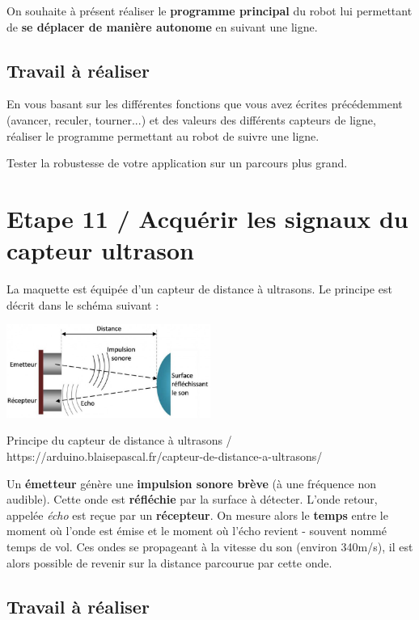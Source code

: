 \documentclass[a4paper,11pt,titlepage]{article} %
\begin{document}
On souhaite à présent réaliser le \textbf{programme principal} du robot lui permettant de \textbf{se déplacer de manière autonome} en suivant une ligne.


\subsection{Travail à réaliser}

\Manip En vous basant sur les différentes fonctions que vous avez écrites précédemment (avancer, reculer, tourner...) et des valeurs des différents capteurs de ligne, réaliser le programme permettant au robot de suivre une ligne.

\Manip Tester la robustesse de votre application sur un parcours plus grand.

\section{Etape 11 / Acquérir les signaux du capteur ultrason}

La maquette est équipée d'un capteur de distance à ultrasons. Le principe est décrit dans le schéma suivant :

\begin{center}
	\includegraphics[width=0.5\textwidth]{images/Principe_Ultrasons_1_arduino.blaisepascal.fr.jpg}
	
	Principe du capteur de distance à ultrasons / https://arduino.blaisepascal.fr/capteur-de-distance-a-ultrasons/
\end{center}

Un \textbf{émetteur} génère une \textbf{impulsion sonore brève} (à une fréquence non audible). Cette onde est \textbf{réfléchie} par la surface à détecter. L'onde retour, appelée \textsl{écho} est reçue par un \textbf{récepteur}. On mesure alors le \textbf{temps} entre le moment où l'onde est émise et le moment où l'écho revient - souvent nommé temps de vol. Ces ondes se propageant à la vitesse du son (environ 340m/s), il est alors possible de revenir sur la distance parcourue par cette onde.

\newpage
\subsection{Travail à réaliser}
\end{document}
